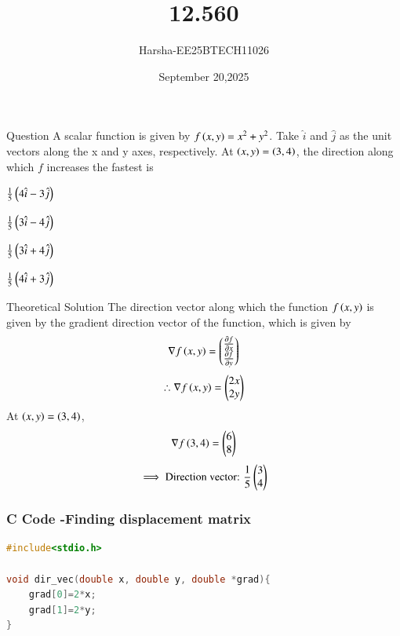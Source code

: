 \documentclass{beamer}
\title %
{12.560}
\date{September 20,2025}
\author %
{Harsha-EE25BTECH11026}
\begin{document}
\frame{\titlepage}


\begin{frame}{Question}
A scalar function is given by $f\left(x,y\right)=x^2+y^2$. Take $\hat{i}$ and $\hat{j}$ as the unit vectors along the x and y axes, respectively. At $\left(x,y\right)=\left(3,4\right)$, the direction along which $f$ increases the fastest is
\begin{enumerate}
\begin{multicols}{4}
    \item $\frac{1}{5}\left(4\hat{i}-3\hat{j}\right)$
    \item $\frac{1}{5}\left(3\hat{i}-4\hat{j}\right)$
    \item $\frac{1}{5}\left(3\hat{i}+4\hat{j}\right)$
    \item $\frac{1}{5}\left(4\hat{i}+3\hat{j}\right)$
\end{multicols}
\end{enumerate}
\end{frame}

\begin{frame}{Theoretical Solution}
The direction vector along which the function $f\left(x,y\right)$ is given by the gradient direction vector of the function, which is given by
\begin{align}
    \nabla f\left(x,y\right)=\begin{pmatrix}\tfrac{\partial f}{\partial x}\\\tfrac{\partial f}{\partial y}\end{pmatrix}
\end{align}
\begin{align}
    \therefore \nabla f\left(x,y\right)=\begin{pmatrix}2x\\2y\end{pmatrix}
\end{align}
At $\left(x,y\right)=\left(3,4\right)$,
\begin{align}
    \nabla f\left(3,4\right)=\begin{pmatrix}6\\8\end{pmatrix}
\end{align}
\begin{align}
    \implies \text{Direction vector: }\frac{1}{5}\begin{pmatrix}3\\4\end{pmatrix}
\end{align}
\end{frame}


\begin{frame}[fragile]
    \frametitle{C Code -Finding displacement matrix}

    \begin{lstlisting}[language=C]
#include<stdio.h>

void dir_vec(double x, double y, double *grad){
	grad[0]=2*x;
	grad[1]=2*y;
}
    \end{lstlisting}
\end{frame}
\end{document}
